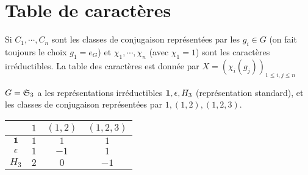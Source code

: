 \section{Table de caractères}

Si  $C_1, \cdots , C_n$ sont les classes de conjugaison représentées par les $g_i \in  G$ (on fait toujours le choix $g_1=e_G$) et $\chi_1, \cdots , \chi_n$ (avec $\chi_1=1$) sont les caractères irréductibles. La table des caractères est donnée par $X=(\chi_i(g_j))_{1\leq i,j\leq n}$
 
\begin{ex}
    $G=\mathfrak S_3$ a les représentations irréductibles $\bm{1}, \epsilon, H_3$ (représentation standard), et les classes de conjugaison représentées par  $1, (1, 2), (1, 2, 3)$.

    \begin{center}
        \begin{tabular}{cccc}
            \hline\hline & $ 1$ & $ (1, 2)$ & $ (1,2,3)$\\
            \hline $\bm{1}$ & $1$ &$1$ &$1$\\
            $ \epsilon$ & $1$ & $-1$ & $1$\\
            $H_3$ & $2$ & $0$ & $-1$\\\hline
    \end{tabular}
    \end{center}
\end{ex}
